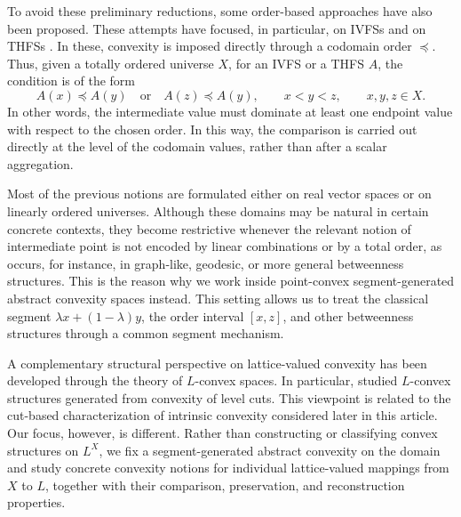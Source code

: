 \documentclass[11pt,a4paper]{article}
\begin{document}
\smallskip

To avoid these preliminary reductions, some order-based approaches have also been proposed. These attempts have focused, in particular, on IVFSs \cite{Huidobro2022} and on THFSs \cite{Huidobro2025}. In these, convexity is imposed directly through a codomain order \(\preccurlyeq\). Thus, given a totally ordered universe \(X\), for an IVFS or a THFS \(A\), the condition is of the form
\begin{equation}\label{eq:order-based-convexity-literature}
A(x)\preccurlyeq A(y)
\quad\text{or}\quad
A(z)\preccurlyeq A(y),
\qquad x<y<z, \qquad x,y,z\in X.
\end{equation}
In other words, the intermediate value must dominate at least one endpoint value with respect to the chosen order. In this way, the comparison is carried out directly at the level of the codomain values, rather than after a scalar aggregation.

\smallskip

Most of the previous notions are formulated either on real vector spaces 
or on linearly ordered universes. Although these domains may be natural in certain concrete contexts, they become restrictive whenever the relevant notion of intermediate point is not encoded by linear combinations or by a total order, as occurs, for instance, in graph-like, geodesic, or more general betweenness structures. This is the reason why we work inside point-convex segment-generated abstract convexity spaces instead. This setting allows us to treat the classical segment \(\lambda x+(1-\lambda)y\), the order interval \([x,z]\), and other betweenness structures through a common segment mechanism.

\smallskip


A complementary structural perspective on lattice-valued convexity has been developed through the theory of \(L\)-convex spaces. In particular, \citet{PangShi2017} studied \(L\)-convex structures generated from convexity of level cuts. This viewpoint is related to the cut-based characterization of intrinsic convexity considered later in this article. Our focus, however, is different. Rather than constructing or classifying convex structures on \(L^X\), we fix a segment-generated abstract convexity on the domain and study concrete convexity notions for individual lattice-valued mappings from \(X\) to \(L\), together with their comparison, preservation, and reconstruction properties. %
\end{document}
